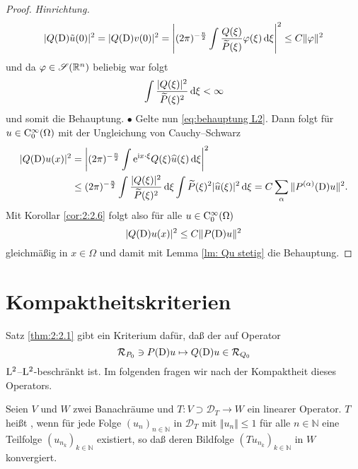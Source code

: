 \begin{proof}{\it Hinrichtung.}
\begin{equation}
|Q(\mathrm D)\tilde{u}(0)|^2 = |Q(\mathrm D)v(0)|^2 = \left|(2 \pi)^{-\frac{n}{2}} \int \frac{Q(\xi)}{\widetilde{P}(\xi)} \varphi(\xi) \,\mathrm d \xi \right|^2 \leq {C} \Vert \varphi \Vert^2
\end{equation}
und da $\varphi\in\mathscr S(\mathbb R^n)$ beliebig war folgt
\begin{equation}\label{eq:behauptung L2}
\int \frac{|Q(\xi)|^2}{\widetilde{P}(\xi)^2} \,\mathrm d \xi < \infty
\end{equation}
und somit die Behauptung. $\bullet$
Gelte nun \eqref{eq:behauptung L2}. Dann folgt für $u \in \mathrm C_0^{\infty}(\Omega)$ mit der Ungleichung von Cauchy--Schwarz
\begin{align}
|Q(\mathrm D)u(x)|^2 &=  \left|(2 \pi)^{-\frac{n}{2}} \int \mathrm e^{\mathrm i x \cdot \xi} Q(\xi) \widehat{u}(\xi)  \,\mathrm d \xi \right|^2 \notag
\\ & \leq (2 \pi)^{-\frac{n}{2}} \int \frac{|Q(\xi)|^2}{\widetilde{P}(\xi)^2} \,\mathrm d \xi \int \widetilde{P}(\xi)^2 | \widehat{u}(\xi)|^2 \,\mathrm d \xi = C \sum_{\alpha} \Vert P^{(\alpha)}(\mathrm D)u\Vert^2.
\end{align}
Mit Korollar \ref{cor:2:2.6} folgt also für alle $u \in \mathrm C_0^{\infty}(\Omega)$
\begin{equation}
|Q(\mathrm D)u(x)|^2 \leq C \Vert P(\mathrm D)u\Vert^2
\end{equation}
gleichmäßig in $x\in\Omega$ und damit mit Lemma \ref{lm: Qu stetig} die Behauptung.
\end{proof}

\section{Kompaktheitskriterien}
Satz \ref{thm:2:2.1} gibt ein Kriterium dafür, daß der auf Operator
\begin{equation}\label{eq:2:map}
\mathcal R_{P_0}\ni P(\mathrm D)u\mapsto Q(\mathrm D)u\in  \mathcal R_{Q_0}
\end{equation}
$\mathrm L^2$--$\mathrm L^2$-beschränkt ist. Im folgenden fragen wir nach der Kompaktheit dieses Operators. 

\begin{df}
Seien $V$ und $W$ zwei Banachräume und $T: V \supset \mathcal{D}_T \rightarrow W$ ein linearer Operator. $T$ heißt , wenn für jede Folge $(u_n)_{n \in \mathbb{N}}$ in $\mathcal{D}_T$ mit $\Vert u_n \Vert \leq 1$ für alle $n \in \mathbb{N}$ eine Teilfolge $(u_{n_k})_{k \in \mathbb{N}}$ existiert, so daß deren Bildfolge $(Tu_{n_k})_{k\in \mathbb{N}}$ in $W$ konvergiert.
\end{df}

